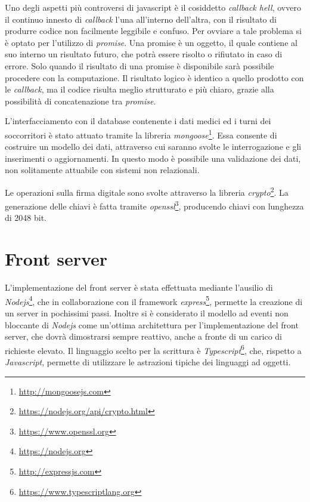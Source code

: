 \documentclass[a4paper,12pt]{report}
\begin{document}
Uno degli aspetti più controversi di javascript è il cosiddetto \emph{callback hell}, ovvero il continuo innesto di \emph{callback} l'una all'interno dell'altra, con il risultato di produrre codice non facilmente leggibile e confuso. Per ovviare a tale problema si è optato per l'utilizzo di \emph{promise}. Una promise è un oggetto, il quale contiene al suo interno un risultato futuro, che potrà essere risolto o rifiutato in caso di errore. Solo quando il risultato di una promise è disponibile sarà possibile procedere con la computazione. Il risultato logico è identico a quello prodotto con le \emph{callback}, ma il codice risulta meglio strutturato e più chiaro, grazie alla possibilità di concatenazione tra \emph{promise}.

L'interfacciamento con il database contenente i dati medici ed i turni dei soccorritori è stato attuato tramite la libreria \emph{mongoose}\footnote{\url{http://mongoosejs.com}}. Essa consente di costruire un modello dei dati, attraverso cui saranno svolte le interrogazione e gli inserimenti o aggiornamenti. In questo modo è possibile una validazione dei dati, non solitamente attuabile con sistemi non relazionali. 

Le operazioni sulla firma digitale sono svolte attraverso la libreria \emph{crypto}\footnote{\url{https://nodejs.org/api/crypto.html}}. La generazione delle chiavi è fatta tramite \emph{openssl}\footnote{\url{https://www.openssl.org}}, producendo chiavi con lunghezza di 2048 bit.
\section{Front server}
L'implementazione del front server è stata effettuata mediante l'ausilio di \emph{Nodejs}\footnote{\url{https://nodejs.org}}, che in collaborazione con il framework \emph{express}\footnote{\url{http://expressjs.com}}, permette la creazione di un server in pochissimi passi. Inoltre si è considerato il modello ad eventi non bloccante di \emph{Nodejs} come un'ottima architettura per l'implementazione del front server, che dovrà dimostrarsi sempre reattivo, anche a fronte di un carico di richieste elevato. Il linguaggio scelto per la scrittura è \emph{Typescript}\footnote{\url{https://www.typescriptlang.org}}, che, rispetto a \emph{Javascript}, permette di utilizzare le astrazioni tipiche dei linguaggi ad oggetti.
\end{document}
